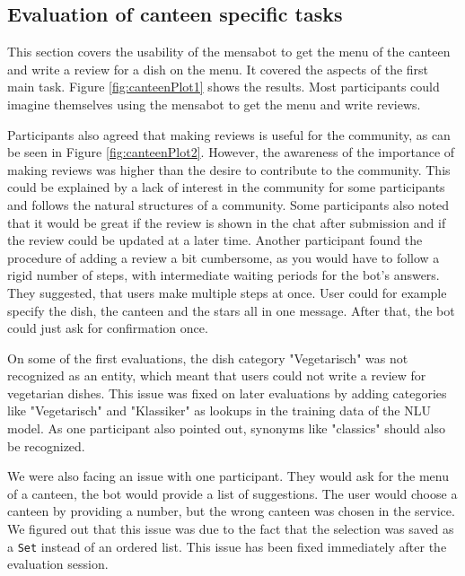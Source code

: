 \subsection{Evaluation of canteen specific tasks}  
This section covers the usability of the mensabot to get the menu of the canteen and write a review for a dish on the menu. It covered the aspects of the first main task. Figure \ref{fig:canteenPlot1} shows the results. Most participants could imagine themselves using the mensabot to get the menu and write reviews.
 
Participants also agreed that making reviews is useful for the community, as can be seen in Figure \ref{fig:canteenPlot2}. 
However, the awareness of the importance of making reviews was higher than the desire to contribute to the community. This could be explained by a lack of interest in the community for some participants and follows the natural structures of a community.
Some participants also noted that it would be great if the review is shown in the chat after submission and if the review could be updated at a later time.
Another participant found the procedure of adding a review a bit cumbersome, as you would have to follow a rigid number of steps, with intermediate waiting periods for the bot's answers. They suggested, that users make multiple steps at once. User could for example specify the dish, the canteen and the stars all in one message. After that, the bot could just ask for confirmation once.

On some of the first evaluations, the dish category "Vegetarisch" was not recognized as an entity, which meant that users could not write a review for vegetarian dishes. This issue was fixed on later evaluations by adding categories like "Vegetarisch" and "Klassiker" as lookups in the training data of the NLU model. As one participant also pointed out, synonyms like "classics" should also be recognized.

We were also facing an issue with one participant. They would ask for the menu of a canteen, the bot would provide a list of suggestions. The user would choose a  canteen by providing a number, but the wrong canteen was chosen in the service. We figured out that this issue was due to the fact that the selection was saved as a \texttt{Set} instead of an ordered list.
This issue has been fixed immediately after the evaluation session.

